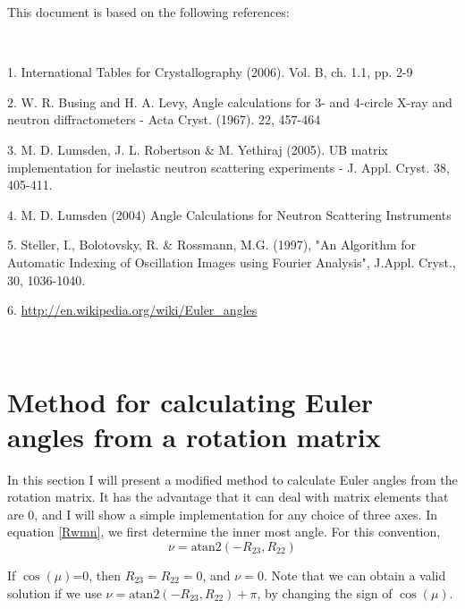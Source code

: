 \documentclass[prb]{revtex4}%
\begin{document}
This document is based on the following references:

\


1. International Tables for Crystallography (2006). Vol. B, ch. 1.1, pp. 2-9

2. W. R. Busing and H. A. Levy, Angle calculations for 3- and 4-circle X-ray and neutron diffractometers - Acta Cryst. (1967). 22, 457-464

3. 	M. D. Lumsden, J. L. Robertson \& M. Yethiraj (2005). UB matrix implementation for inelastic neutron scattering experiments - J. Appl. Cryst. 38, 405-411.

4. M. D. Lumsden (2004) Angle Calculations for Neutron Scattering Instruments

5. Steller, I., Bolotovsky, R. \& Rossmann, M.G. (1997), "An Algorithm for Automatic Indexing of Oscillation Images using Fourier Analysis", J.Appl. Cryst., 30, 1036-1040.

6. \href{http://en.wikipedia.org/wiki/Euler_angles}{http://en.wikipedia.org/wiki/Euler\_angles}

\
\appendix*
\section{Method for calculating Euler angles from a rotation matrix}

In this section I will present a modified method to calculate Euler angles from the rotation matrix. It has the advantage that it can deal with
matrix elements that are 0, and I will show a simple implementation for any choice of three axes. In equation \ref{Rwmn}, we first determine the inner most angle.
For this convention,
\begin{equation}
    \nu=\textrm{atan2}(-R_{23},R_{22})
\end{equation}

If $\cos(\mu)$=0, then $R_{23} = R_{22} = 0$, and $\nu = 0$.
Note that we can obtain a valid solution if we use $\nu=\textrm{atan2}(-R_{23},R_{22})+\pi$, by changing the sign of $\cos(\mu)$.
\end{document}
